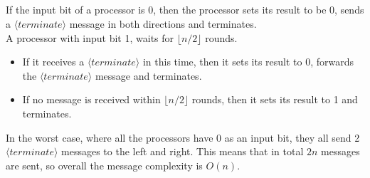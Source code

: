 \documentclass[11pt]{article}
\begin{document}
\subsection{}

%
%
%	
%

If the input bit of a processor is 0, then the processor sets its result to be 0, sends a $\langle terminate \rangle$ message in both directions and terminates.\\
A processor with input bit 1, waits for  $\lfloor n/2 \rfloor$ rounds.
\begin{itemize}
\item If it receives a $\langle terminate \rangle$ in this time, then it sets its result to 0, forwards the $\langle terminate \rangle$ message and terminates.
\item If no message is received within $\lfloor n/2 \rfloor$ rounds, then it sets its result to 1 and terminates.
\end{itemize}

In the worst case, where all the processors have 0 as an input bit, they all send 2 $\langle terminate \rangle$ messages to the left and right. This means that in total $2n$ messages are sent, so overall the message complexity is $O(n)$.
\end{document}
